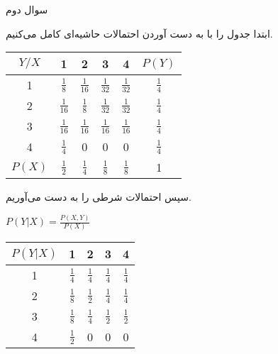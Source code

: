\Problem
{سوال دوم}
{
ابتدا جدول را با به دست آوردن احتمالات حاشیه‌ای  کامل می‌کنیم.

\begin{latin}
\begin{center}
  \renewcommand{\arraystretch}{1.6}
  \begin{tabular}{| c | c | c | c | c | c |}
    \hline
    $Y/X$ & 1 & 2 & 3 & 4 & $P(Y)$ \\ \hline
    1 & $\frac{1}{8}$ & $\frac{1}{16}$ & $\frac{1}{32}$ & $\frac{1}{32}$ & $\frac{1}{4}$ \\ \hline
    2 & $\frac{1}{16}$ & $\frac{1}{8}$ & $\frac{1}{32}$ & $\frac{1}{32}$ & $\frac{1}{4}$ \\ \hline
    3 & $\frac{1}{16}$ & $\frac{1}{16}$ & $\frac{1}{16}$ & $\frac{1}{16}$ & $\frac{1}{4}$ \\ \hline
    4 & $\frac{1}{4}$ & 0 & 0 & 0 & $\frac{1}{4}$ \\ \hline
    $P(X)$ & $\frac{1}{2}$ & $\frac{1}{4}$ & $\frac{1}{8}$ & $\frac{1}{8}$ & 1 \\
    \hline
  \end{tabular}
\end{center}
\end{latin}

سپس احتمالات شرطی را به دست می‌آوریم.

\begin{center}
$P(Y|X) = \frac{P(X,Y)}{P(X)}$
\end{center}

\begin{latin}
\begin{center}
  \renewcommand{\arraystretch}{1.6}
  \begin{tabular}{| c | c | c | c | c |}
    \hline
    $P(Y|X)$ & 1 & 2 & 3 & 4 \\ \hline
    1 & $\frac{1}{4}$ & $\frac{1}{4}$ & $\frac{1}{4}$ & $\frac{1}{4}$ \\ \hline
    2 & $\frac{1}{8}$ & $\frac{1}{2}$ & $\frac{1}{4}$ & $\frac{1}{4}$ \\ \hline
    3 & $\frac{1}{8}$ & $\frac{1}{4}$ & $\frac{1}{2}$ & $\frac{1}{2}$ \\ \hline
    4 & $\frac{1}{2}$ & 0 & 0 & 0 \\
    \hline
  \end{tabular}
\end{center}
\end{latin}

\vspace{3cm}

}
